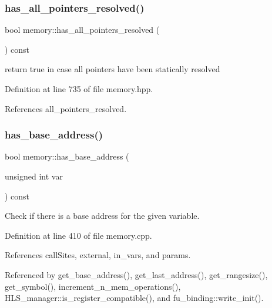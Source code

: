\subsubsection{\texorpdfstring{has\+\_\+all\+\_\+pointers\+\_\+resolved()}{has\_all\_pointers\_resolved()}}
{\footnotesize\ttfamily bool memory\+::has\+\_\+all\+\_\+pointers\+\_\+resolved (\begin{DoxyParamCaption}{ }\end{DoxyParamCaption}) const\hspace{0.3cm}{\ttfamily [inline]}}



return true in case all pointers have been statically resolved 



Definition at line 735 of file memory.\+hpp.



References all\+\_\+pointers\+\_\+resolved.

\mbox{\label{classmemory_a96f4c37de951e186df09a2ddc249d77b}} 
\subsubsection{\texorpdfstring{has\+\_\+base\+\_\+address()}{has\_base\_address()}}
{\footnotesize\ttfamily bool memory\+::has\+\_\+base\+\_\+address (\begin{DoxyParamCaption}\item[{unsigned int}]{var }\end{DoxyParamCaption}) const}



Check if there is a base address for the given variable. 



Definition at line 410 of file memory.\+cpp.



References call\+Sites, external, in\+\_\+vars, and params.



Referenced by get\+\_\+base\+\_\+address(), get\+\_\+last\+\_\+address(), get\+\_\+rangesize(), get\+\_\+symbol(), increment\+\_\+n\+\_\+mem\+\_\+operations(), H\+L\+S\+\_\+manager\+::is\+\_\+register\+\_\+compatible(), and fu\+\_\+binding\+::write\+\_\+init().

